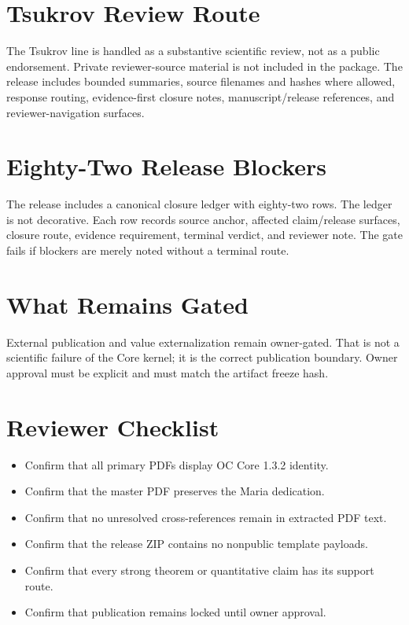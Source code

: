 \documentclass[11pt,a4paper]{article}
\begin{document}
\section*{Tsukrov Review Route}
The Tsukrov line is handled as a substantive scientific review, not as a public endorsement. Private reviewer-source material is not included in the package. The release includes bounded summaries, source filenames and hashes where allowed, response routing, evidence-first closure notes, manuscript/release references, and reviewer-navigation surfaces.

\section*{Eighty-Two Release Blockers}
The release includes a canonical closure ledger with eighty-two rows. The ledger is not decorative. Each row records source anchor, affected claim/release surfaces, closure route, evidence requirement, terminal verdict, and reviewer note. The gate fails if blockers are merely noted without a terminal route.

\section*{What Remains Gated}
External publication and value externalization remain owner-gated. That is not a scientific failure of the Core kernel; it is the correct publication boundary. Owner approval must be explicit and must match the artifact freeze hash.

\section*{Reviewer Checklist}
\begin{itemize}
  \item Confirm that all primary PDFs display OC Core 1.3.2 identity.
  \item Confirm that the master PDF preserves the Maria dedication.
  \item Confirm that no unresolved cross-references remain in extracted PDF text.
  \item Confirm that the release ZIP contains no nonpublic template payloads.
  \item Confirm that every strong theorem or quantitative claim has its support route.
  \item Confirm that publication remains locked until owner approval.
\end{itemize}
\end{document}
